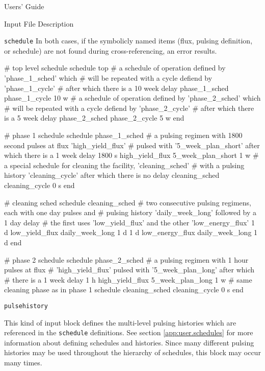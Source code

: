 \begin{chapter}{Users' Guide\label{app:user.guide}}
\begin{section}{Input File Description\label{app:user.input}}
\begin{subsection}{\texttt{schedule}\label{app:user.input.sched}}
      In both cases, if the symbolicly named items (flux, pulsing
      definition, or schedule) are not found during cross-referencing,
      an error results.

      \begin{center}
        \renewcommand{\baselinestretch}{1}\normalsize
        \begin{boxedverbatim}
# top level schedule
schedule top
    # a schedule of operation defined by 'phase_1_sched' which
    #     will be repeated with a cycle defiend by 'phase_1_cycle'
    #     after which there is a 10 week delay
  phase_1_sched phase_1_cycle 10 w
    # a schedule of operation defined by 'phase_2_sched' which
    #     will be repeated with a cycle defiend by 'phase_2_cycle'
    #     after which there is a 5 week delay
  phase_2_sched phase_2_cycle 5 w
end

# phase 1 schedule
schedule phase_1_sched
    # a pulsing regimen with 1800 second pulses at flux 'high_yield_flux' 
    # pulsed with '5_week_plan_short' after which there is a 1 week delay
  1800 s high_yield_flux 5_week_plan_short 1 w
    # a special schedule for cleaning the facility, 'cleaning_sched'
    # with a pulsing history 'cleaning_cycle' after which there is no delay
  cleaning_sched cleaning_cycle 0 s
end

# cleaning sched
schedule cleaning_sched
    # two consecutive pulsing regimens, each with one day pulses and
    # pulsing history 'daily_week_long' followed by a 1 day delay
    # the first uses 'low_yield_flux' and the other 'low_energy_flux'
  1 d low_yield_flux daily_week_long 1 d
  1 d low_energy_flux daily_week_long 1 d
end

# phase 2 schedule
schedule phase_2_sched
    # a pulsing regimen with 1 hour pulses at flux 
    # 'high_yield_flux' pulsed with '5_week_plan_long' after which
    # there is a 1 week delay
  1 h high_yield_flux 5_week_plan_long 1 w
    # same cleaning phase as in phase 1 schedule
  cleaning_sched cleaning_cycle 0 s
end
\end{boxedverbatim}
      \end{center}

    \end{subsection}

    \begin{subsection}{\texttt{pulsehistory}\label{app:user.input.pulse}}
      
      This kind of input block defines the multi-level pulsing
      histories which are referenced in the \texttt{schedule}
      definitions.  See section \ref{app:user.schedules} for more
      information about defining schedules and histories.  Since many
      different pulsing histories may be used throughout the hierarchy
      of schedules, this block may occur many times.


\end{subsection}
\end{section}
\end{chapter}
